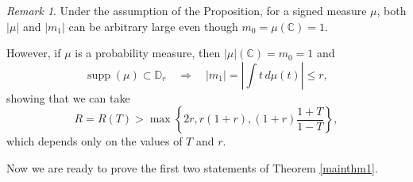 \documentclass[reqno,11pt]{amsart}
\theoremstyle{plain}
\theoremstyle{definition}
\theoremstyle{remark}
\newtheorem{remark}[thm]{Remark}
\numberwithin{equation}{section}
\numberwithin{equation}{section}
\DeclareMathOperator{\supp}{supp}
\newcommand{\C}{\mathbb{C}}
\newcommand{\D}{\mathbb{D}}
\begin{document}
\begin{remark}
Under the assumption of the Proposition,  for a signed measure $\mu$, both  $|\mu| $  and $|m_1|$ can be arbitrary large even though $m_0=\mu(\C)=1$.

However, if $\mu$ is a probability measure, then $|\mu|(\C)=m_0=1$ and 
	$$
	\supp(\mu)\subset\D_r \quad \Rightarrow \quad |m_1| =\left| \int t \, d\mu(t) \right|  \le r,
	$$
showing that we can take
	\begin{equation}
	    \label{boundForR}
     R =R(T)>    \max \left\{  2r,   r(1+r)  ,  \left(1+r \right)\frac{1+T}{1-T}  \right\}, %
	\end{equation}
 which depends only on the values of $T$ and $r$. 
\end{remark}

Now we are ready to prove the first two statements of Theorem \ref{mainthm1}.
\end{document}
